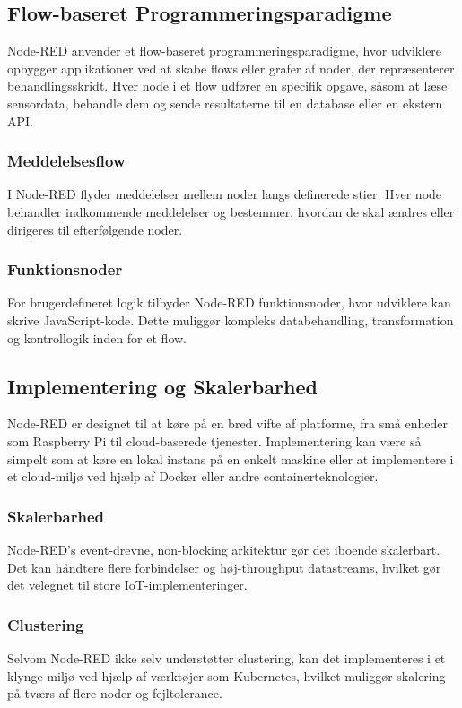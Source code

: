 \subsection{Flow-baseret Programmeringsparadigme}
Node-RED anvender et flow-baseret programmeringsparadigme, hvor udviklere opbygger applikationer ved at skabe flows eller grafer af noder, der repræsenterer behandlingsskridt. Hver node i et flow udfører en specifik opgave, såsom at læse sensordata, behandle dem og sende resultaterne til en database eller en ekstern API.

\subsubsection{Meddelelsesflow}
I Node-RED flyder meddelelser mellem noder langs definerede stier. Hver node behandler indkommende meddelelser og bestemmer, hvordan de skal ændres eller dirigeres til efterfølgende noder.

\subsubsection{Funktionsnoder}
For brugerdefineret logik tilbyder Node-RED funktionsnoder, hvor udviklere kan skrive JavaScript-kode. Dette muliggør kompleks databehandling, transformation og kontrollogik inden for et flow.

\subsection{Implementering og Skalerbarhed}
Node-RED er designet til at køre på en bred vifte af platforme, fra små enheder som Raspberry Pi til cloud-baserede tjenester. Implementering kan være så simpelt som at køre en lokal instans på en enkelt maskine eller at implementere i et cloud-miljø ved hjælp af Docker eller andre containerteknologier.

\subsubsection{Skalerbarhed}
Node-RED's event-drevne, non-blocking arkitektur gør det iboende skalerbart. Det kan håndtere flere forbindelser og høj-throughput datastreams, hvilket gør det velegnet til store IoT-implementeringer.

\subsubsection{Clustering}
Selvom Node-RED ikke selv understøtter clustering, kan det implementeres i et klynge-miljø ved hjælp af værktøjer som Kubernetes, hvilket muliggør skalering på tværs af flere noder og fejltolerance.

